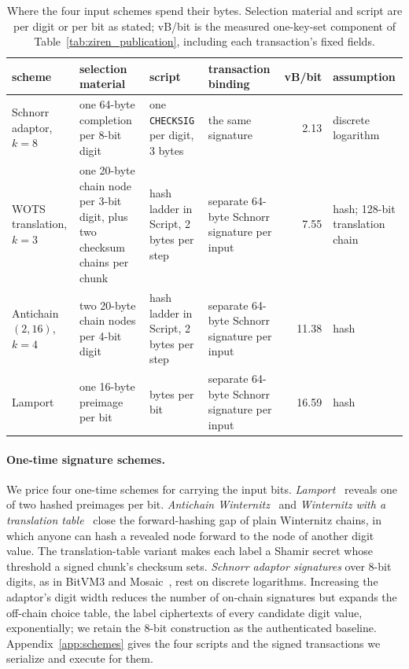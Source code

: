 \documentclass[11pt]{article}
\begin{document}
\begin{table}[t]\centering\footnotesize\setlength{\tabcolsep}{4pt}
\begin{tabularx}{\textwidth}{>{\raggedright\arraybackslash}p{2.2cm}>{\raggedright\arraybackslash}p{3.7cm}>{\raggedright\arraybackslash}p{2.9cm}>{\raggedright\arraybackslash}p{2.6cm}r>{\raggedright\arraybackslash}X}\toprule
scheme & selection material & script & transaction binding & vB/bit & assumption\\\midrule
Schnorr adaptor, $k=8$ & one 64-byte completion per 8-bit digit & one \texttt{CHECKSIG} per digit, 3 bytes & the same signature & 2.13 & discrete logarithm\\
WOTS translation, $k=3$ & one 20-byte chain node per 3-bit digit, plus two checksum chains per chunk & hash ladder in Script, 2 bytes per step & separate 64-byte Schnorr signature per input & 7.55 & hash; 128-bit translation chain\\
Antichain $(2,16)$, $k=4$ & two 20-byte chain nodes per 4-bit digit & hash ladder in Script, 2 bytes per step & separate 64-byte Schnorr signature per input & 11.38 & hash\\
Lamport & one 16-byte preimage per bit & 49 bytes per bit & separate 64-byte Schnorr signature per input & 16.59 & hash\\\bottomrule
\end{tabularx}
\caption{Where the four input schemes spend their bytes. Selection material
and script are per digit or per bit as stated; vB/bit is the measured
one-key-set component of Table~\ref{tab:ziren_publication}, including each transaction's fixed fields.}
\label{tab:bytes}
\end{table}

\paragraph{One-time signature schemes.} We price four one-time schemes for
carrying the input bits. \emph{Lamport}~\cite{lamport79} reveals one of two
hashed preimages per bit. \emph{Antichain Winternitz}~\cite{antichain26} and
\emph{Winternitz with a translation table}~\cite{wotstranslation26} close the forward-hashing gap of plain Winternitz chains, in which anyone can
hash a revealed node forward to the node of another digit value. The
translation-table variant makes each label a Shamir secret whose threshold a
signed chunk's checksum sets.
\emph{Schnorr adaptor signatures} over 8-bit digits, as in BitVM3 and
Mosaic~\cite{bitvm3paper,mosaic26}, rest on discrete logarithms. Increasing
the adaptor's digit width reduces the number of on-chain signatures but
expands the off-chain choice table, the label ciphertexts of every candidate digit value, exponentially; we retain the 8-bit
construction as the authenticated baseline. Appendix~\ref{app:schemes} gives the four scripts and the signed transactions we serialize and execute for them.
\end{document}
